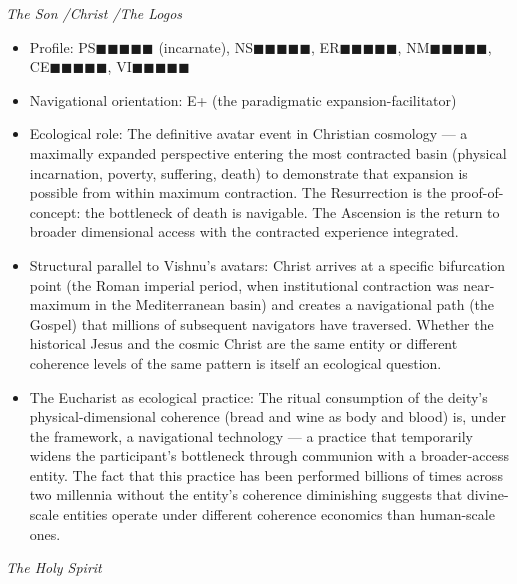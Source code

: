 \textit{The Son /\allowbreak  Christ /\allowbreak  The Logos}

\begin{itemize}[nosep,leftmargin=*]
  \item Profile: PS$\blacksquare$$\blacksquare$$\blacksquare$$\blacksquare$$\blacksquare$ (incarnate), NS$\blacksquare$$\blacksquare$$\blacksquare$$\blacksquare$$\blacksquare$, ER$\blacksquare$$\blacksquare$$\blacksquare$$\blacksquare$$\blacksquare$, NM$\blacksquare$$\blacksquare$$\blacksquare$$\blacksquare$$\blacksquare$, CE$\blacksquare$$\blacksquare$$\blacksquare$$\blacksquare$$\blacksquare$, VI$\blacksquare$$\blacksquare$$\blacksquare$$\blacksquare$$\blacksquare$
  \item Navigational orientation: E+ (the paradigmatic expansion-facilitator)
  \item Ecological role: The definitive avatar event in Christian cosmology — a maximally expanded perspective entering the most contracted basin (physical incarnation, poverty, suffering, death) to demonstrate that expansion is possible from within maximum contraction. The Resurrection is the proof-of-concept: the bottleneck of death is navigable. The Ascension is the return to broader dimensional access with the contracted experience integrated.
  \item Structural parallel to Vishnu's avatars: Christ arrives at a specific bifurcation point (the Roman imperial period, when institutional contraction was near-maximum in the Mediterranean basin) and creates a navigational path (the Gospel) that millions of subsequent navigators have traversed. Whether the historical Jesus and the cosmic Christ are the same entity or different coherence levels of the same pattern is itself an ecological question.
  \item The Eucharist as ecological practice: The ritual consumption of the deity's physical-dimensional coherence (bread and wine as body and blood) is, under the framework, a navigational technology — a practice that temporarily widens the participant's bottleneck through communion with a broader-access entity. The fact that this practice has been performed billions of times across two millennia without the entity's coherence diminishing suggests that divine-scale entities operate under different coherence economics than human-scale ones.
\end{itemize}


\textit{The Holy Spirit}

